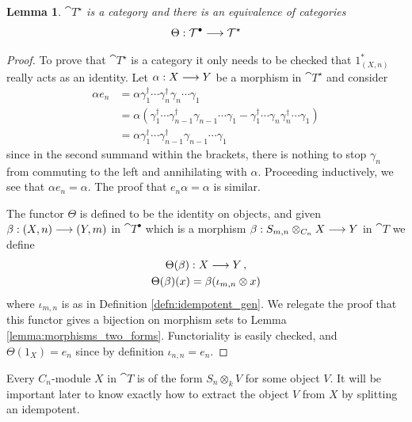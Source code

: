 \documentclass[english,letter paper,12pt,leqno]{article}
\newtheorem{lemma}[theorem]{Lemma}
\theoremstyle{example}
\numberwithin{equation}{section}
\begin{document}
\begin{lemma}\label{lemma:equivcliffordthick} $\cat{T}^{\star}$ is a category and there is an equivalence of categories
\[
\Theta: \mathcal{T}^\bullet \longrightarrow \mathcal{T}^{\star}
\]
\end{lemma}
\begin{proof}
To prove that $\cat{T}^{\star}$ is a category it only needs to be checked that $1^*_{(X,n)}$ really acts as an identity. Let $\alpha: X \longrightarrow Y$ be a morphism in $\cat{T}^{\star}$ and consider
\begin{align*}
\alpha e_n &= \alpha \gamma_1^\dagger \cdots \gamma_n^\dagger \gamma_n \cdots \gamma_1\\
&= \alpha \left( \gamma_1^\dagger \cdots \gamma_{n-1}^\dagger \gamma_{n-1} \cdots \gamma_1 - \gamma_1^\dagger \cdots \gamma_n \gamma_n^\dagger \cdots \gamma_1 \right)\\
&= \alpha \gamma_1^\dagger \cdots \gamma_{n-1}^\dagger \gamma_{n-1} \cdots \gamma_1
\end{align*}
since in the second summand within the brackets, there is nothing to stop $\gamma_n$ from commuting to the left and annihilating with $\alpha$. Proceeding inductively, we see that $\alpha e_n = \alpha$. The proof that $e_n \alpha = \alpha$ is similar.

The functor $\Theta$ is defined to be the identity on objects, and given $\beta: (X,n) \longrightarrow (Y,m)$ in $\cat{T}^{\bullet}$ which is a morphism $\beta: S_{m,n} \otimes_{C_n} X \longrightarrow Y$ in $\cat{T}$ we define
\begin{gather*}
\Theta(\beta): X \longrightarrow Y\,,\\
\Theta(\beta)( x ) = \beta( \iota_{m,n} \otimes x )
\end{gather*}
where $\iota_{m,n}$ is as in Definition \ref{defn:idempotent_gen}. We relegate the proof that this functor gives a bijection on morphism sets to Lemma \ref{lemma:morphisms_two_forms}. Functoriality is easily checked, and $\Theta(1_X) = e_n$ since by definition $\iota_{n,n} = e_n$.
\end{proof}

Every $C_n$-module $X$ in $\cat{T}$ is of the form $S_n \otimes_k V$ for some object $V$. It will be important later to know exactly how to extract the object $V$ from $X$ by splitting an idempotent.
\end{document}
